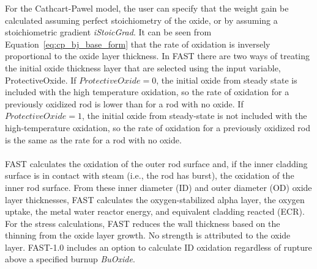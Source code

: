 For the Cathcart-Pawel model, the user can specify that the weight gain be calculated assuming
perfect stoichiometry of the oxide, or by assuming a stoichiometric gradient \textit{iStoicGrad}. It
can be seen from Equation~\ref{eq:cp_bj_base_form} that the rate of oxidation is inversely
proportional to the oxide layer thickness. In FAST there are two ways of treating the initial oxide
thickness layer that are selected using the input variable, ProtectiveOxide. If $ProtectiveOxide =
0$, the initial oxide from steady state is included with the high temperature oxidation, so the rate
of oxidation for a previously oxidized rod is lower than for a rod with no oxide. If
$ProtectiveOxide = 1$, the initial oxide from steady-state is not included with the high-temperature
oxidation, so the rate of oxidation for a previously oxidized rod is the same as the rate for a rod
with no oxide.
\\
\\
FAST calculates the oxidation of the outer rod surface and, if the inner cladding surface is in
contact with steam (i.e., the rod has burst), the oxidation of the inner rod surface. From these
inner diameter (ID) and outer diameter (OD) oxide layer thicknesses, FAST calculates the
oxygen-stabilized alpha layer, the oxygen uptake, the metal water reactor energy, and equivalent
cladding reacted (ECR). For the stress calculations, FAST reduces the wall thickness based on the
thinning from the oxide layer growth. No strength is attributed to the oxide layer.  FAST-1.0
includes an option to calculate ID oxidation regardless of rupture above a specified burnup
\textit{BuOxide}.

